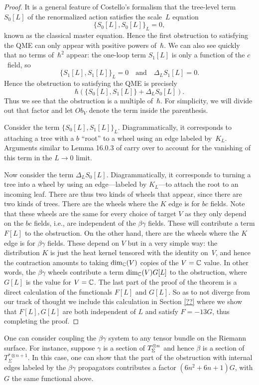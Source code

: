 \begin{proof}
It is a general feature of Costello's formalism that the tree-level term $S_0[L]$ of the renormalized action satisfies the scale~$L$ equation
\[
\{S_0[L],S_0[L]\}_L = 0,
\]
known as the classical master equation.
Hence the first obstruction to satisfying the QME can only appear with positive powers of~$\hbar$.
We can also see quickly that no terms of~$\hbar^2$ appear:
the one-loop term $S_1[L]$ is only a function of the $c$~field, 
so 
\[
\{S_1[L],S_1[L]\}_L = 0 \quad\text{and}\quad \Delta_L S_1[L] = 0.
\]
Hence the obstruction to satisfying the QME is precisely
\[
\hbar\left( \{S_0[L],S_1[L]\} + \Delta_L S_0[L] \right).
\]
Thus we see that the obstruction is a multiple of~$\hbar$.
For simplicity, we will divide out that factor and let $Ob_V$ denote the term inside the parenthesis.

Consider the term $\{S_0[L],S_1[L]\}_L$. 
Diagrammatically, it corresponds to attaching a tree with a $b$ ``root'' to a wheel using an edge labeled by~$K_L$.
Arguments similar to Lemma 16.0.3 of \cite{wg2} carry over to account for the vanishing of this term in the $L \to 0$ limit. 


Now consider the term $\Delta_L S_0[L]$. 
Diagrammatically, it corresponds to turning a tree into a wheel by using an edge---labeled by $K_L$---to attach the root to an incoming leaf.
There are thus two kinds of wheels that appear, since there are two kinds of trees.
There are the wheels where the $K$ edge is for $bc$ fields.
Note that these wheels are the same for every choice of target $V$
as they only depend on the $bc$ fields, i.e., are independent of the $\beta\gamma$ fields.
These will contribute a term $F[L]$ to the obstruction.
On the other hand, there are the wheels where the $K$ edge is for $\beta\gamma$ fields.
These depend on $V$ but in a very simple way: 
the distribution $K$ is just the heat kernel tensored with the identity on~$V$, 
and hence the contraction amounts to taking $\dim_\mathbb C(V)$ copies of the $V = \mathbb C$ value.
In other words, the $\beta\gamma$ wheels contribute a term $\dim_\mathbb C(V) G[L]$ to the obstruction,
where $G[L]$ is the value for $V = \mathbb C$.
The last part of the proof of the theorem is a direct calculation of the functionals $F[L]$ and $G[L]$. 
So as to not diverge from our track of thought we include this calculation in Section \ref{??} where we show that $F[L], G[L]$ are both independent of $L$ and satisfy $F = -13 G$, thus completing the proof.
\end{proof}

\begin{rmk} One can consider coupling the $\beta\gamma$ system to any tensor bundle on the Riemann surface. 
For instance, suppose $\gamma$ is a section of $T_\Sigma^{\otimes n}$ and hence $\beta$ is a section of $T^{* \otimes {n+1}}_\Sigma$.
In this case, one can show that the part of the obstruction with internal edges labeled by the $\beta\gamma$ propagators contributes a factor $(6n^2 + 6n + 1)G$, with $G$ the same functional above. 
\end{rmk}





